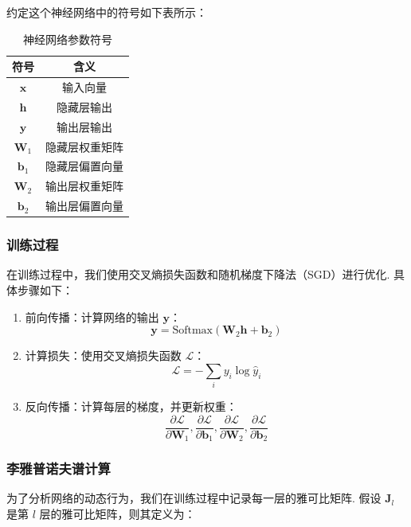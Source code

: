 约定这个神经网络中的符号如下表所示：

\begin{table}[htbp]
  \centering
  \caption{神经网络参数符号}
  \label{tab:nn}
  \begin{tabular}{cc}
     \toprule
     符号 & 含义 \\
       \midrule
       \(\mathbf{x}\) & 输入向量 \\
         \(\mathbf{h}\) & 隐藏层输出 \\
         \(\mathbf{y}\) & 输出层输出 \\
         \(\mathbf{W}_1\) & 隐藏层权重矩阵 \\
         \(\mathbf{b}_1\) & 隐藏层偏置向量 \\
         \(\mathbf{W}_2\) & 输出层权重矩阵 \\
         \(\mathbf{b}_2\) & 输出层偏置向量 \\
       \bottomrule
   \end{tabular}
\end{table}

\subsubsection{训练过程}

在训练过程中，我们使用交叉熵损失函数和随机梯度下降法（SGD）进行优化. 具体步骤如下：

\begin{enumerate}
   \item 前向传播：计算网络的输出 \(\mathbf{y}\)：
   \[
   \mathbf{y} = \text{Softmax}(\mathbf{W}_2 \mathbf{h} + \mathbf{b}_2)
   \]
   \item 计算损失：使用交叉熵损失函数 \(\mathcal{L}\)：
   \[
   \mathcal{L} = -\sum_{i} y_i \log \hat{y}_i
   \]
   \item 反向传播：计算每层的梯度，并更新权重：
   \[
   \frac{\partial \mathcal{L}}{\partial \mathbf{W}_1}, \frac{\partial \mathcal{L}}{\partial \mathbf{b}_1}, \frac{\partial \mathcal{L}}{\partial \mathbf{W}_2}, \frac{\partial \mathcal{L}}{\partial \mathbf{b}_2}
   \]
\end{enumerate}

\subsubsection{李雅普诺夫谱计算}

为了分析网络的动态行为，我们在训练过程中记录每一层的雅可比矩阵. 假设 \(\mathbf{J}_l\) 是第 \(l\) 层的雅可比矩阵，则其定义为：

